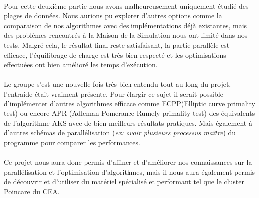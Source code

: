 	\paragraph{}Pour cette deuxième partie nous avons malheureusement uniquement étudié des plages de données. Nous aurions pu explorer d'autres options comme la comparaison de nos algorithmes avec des implémentations déjà existantes, mais des problèmes rencontrés à la Maison de la Simulation nous ont limité dans nos tests. Malgré cela, le résultat final reste satisfaisant, la partie parallèle est efficace, l'équilibrage de charge est très bien respecté et les optimisations effectuées ont bien amélioré les temps d’exécution.
	
	\paragraph{}Le groupe s'est une nouvelle fois très bien entendu tout au long du projet, l'entraide était vraiment présente. Pour élargir ce sujet il serait possible d’implémenter d'autres algorithmes efficace comme ECPP(Elliptic curve primality test) ou encore APR (Adleman-Pomerance-Rumely primality test) des équivalents de l'algorithme AKS avec de bien meilleurs résultats pratiques. Mais également à d'autres schémas de parallélisation (\textit{ex: avoir plusieurs processus maître}) du programme pour comparer les performances.
	
	\paragraph{}Ce projet nous aura donc permis d'affiner et d'améliorer nos connaissances sur la parallélisation et l'optimisation d'algorithmes, mais il nous aura également permis de découvrir et d'utiliser du matériel spécialisé et performant tel que le cluster Poincare du CEA. 




